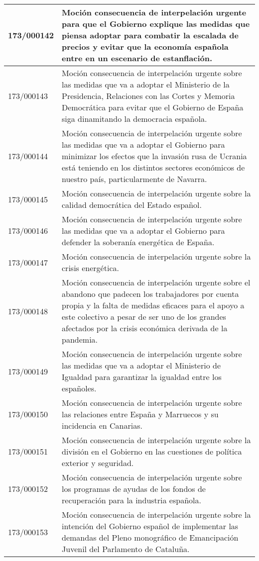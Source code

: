 {\begin{table}[H]
\begin{center}
\begin{tabularx}{\linewidth}{| l | X |}
\hline
173/000142 & Moción consecuencia de interpelación urgente para que el Gobierno explique las medidas que piensa adoptar para combatir la escalada de precios y evitar que la economía española entre en un escenario de estanflación. \\
\hline
173/000143 & Moción consecuencia de interpelación urgente sobre las medidas que va a adoptar el Ministerio de la Presidencia, Relaciones con las Cortes y Memoria Democrática para evitar que el Gobierno de España siga dinamitando la democracia española. \\
\hline
173/000144 & Moción consecuencia de interpelación urgente sobre las medidas que va a adoptar el Gobierno para minimizar los efectos que la invasión rusa de Ucrania está teniendo en los distintos sectores económicos de nuestro país, particularmente de Navarra. \\
\hline
173/000145 & Moción consecuencia de interpelación urgente sobre la calidad democrática del Estado español. \\
\hline
173/000146 & Moción consecuencia de interpelación urgente sobre las medidas que va a adoptar el Gobierno para defender la soberanía energética de España. \\
\hline
173/000147 & Moción consecuencia de interpelación urgente sobre la crisis energética. \\
\hline
173/000148 & Moción consecuencia de interpelación urgente sobre el abandono que padecen los trabajadores por cuenta propia y la falta de medidas eficaces para el apoyo a este colectivo a pesar de ser uno de los grandes afectados por la crisis económica derivada de la pandemia. \\
\hline
173/000149 & Moción consecuencia de interpelación urgente sobre las medidas que va a adoptar el Ministerio de Igualdad para garantizar la igualdad entre los españoles. \\
\hline
173/000150 & Moción consecuencia de interpelación urgente sobre las relaciones entre España y Marruecos y su incidencia en Canarias. \\
\hline
173/000151 & Moción consecuencia de interpelación urgente sobre la división en el Gobierno en las cuestiones de política exterior y seguridad. \\
\hline
173/000152 & Moción consecuencia de interpelación urgente sobre los programas de ayudas de los fondos de recuperación para la industria española. \\
\hline
173/000153 & Moción consecuencia de interpelación urgente sobre la intención del Gobierno español de implementar las demandas del Pleno monográfico de Emancipación Juvenil del Parlamento de Cataluña. \\

\end{tabularx}
\end{center}
\end{table}}
